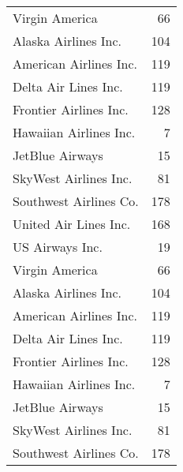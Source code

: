 \documentclass{article}
\begin{document}
\begin{longtable}[]{@{}lr@{}}
  Virgin America & 66 \\
  Alaska Airlines Inc. & 104 \\
  American Airlines Inc. & 119 \\
  Delta Air Lines Inc. & 119 \\
  Frontier Airlines Inc. & 128 \\
  Hawaiian Airlines Inc. & 7 \\
  JetBlue Airways & 15 \\
  SkyWest Airlines Inc. & 81 \\
  Southwest Airlines Co. & 178 \\
  United Air Lines Inc. & 168 \\
  US Airways Inc. & 19 \\
  Virgin America & 66 \\
  Alaska Airlines Inc. & 104 \\
  American Airlines Inc. & 119 \\
  Delta Air Lines Inc. & 119 \\
  Frontier Airlines Inc. & 128 \\
  Hawaiian Airlines Inc. & 7 \\
  JetBlue Airways & 15 \\
  SkyWest Airlines Inc. & 81 \\
  Southwest Airlines Co. & 178 \\
  \bottomrule
\end{longtable}
\end{document}
